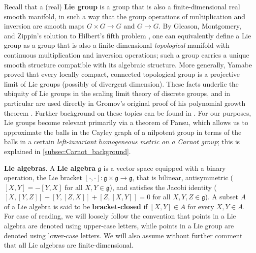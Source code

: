 Recall that a (real) \textbf{Lie group} is a group that is also a finite-dimensional real smooth manifold, in such a way that the group operations of multiplication and inversion are smooth maps $G\times G \to G$ and $G\to G$. By Gleason, Montgomery, and Zippin's solution to Hilbert's fifth problem \cite{MR49204,MR49203}, one can equivalently define a Lie group as a group that is also a finite-dimensional \emph{topological} manifold with continuous multiplication and inversion operations; such a group carries a unique smooth structure compatible with its algebraic structure. More generally, Yamabe \cite{MR36766} proved that every locally compact, connected topological group is a projective limit of Lie groups (possibly of divergent dimension). These facts underlie the ubiquity of Lie groups in the scaling limit theory of discrete groups, and in particular are used directly in Gromov's original proof of his polynomial growth theorem \cite{gromov81poly}. Further background on these topics can be found in \cite{MR3237440}. For our purposes, Lie groups become relevant primarily via a theorem of Pansu, which allows us to approximate the balls in the Cayley graph of a nilpotent group in terms of the balls in a certain \emph{left-invariant homogeneous metric on a Carnot group}; this is explained in \cref{subsec:Carnot_background}.

\medskip

\textbf{Lie algebras}. A \textbf{Lie algebra} $\mathfrak{g}$ is a vector space equipped with a binary operation, the Lie bracket $[\cdot, \cdot]: \mathfrak{g} \times \mathfrak{g} \rightarrow \mathfrak{g}$, that is bilinear, antisymmetric ($[X, Y] = -[Y, X]$ for all $X, Y \in \mathfrak{g}$), and satisfies the Jacobi identity ($[X, [Y, Z]] + [Y, [Z, X]] + [Z, [X, Y]] = 0$ for all $X, Y, Z \in \mathfrak{g}$). A subset $A$ of a Lie algebra is said to be \textbf{bracket-closed} if $[X,Y]\in A$ for every $X,Y\in A$.
For ease of reading, we will loosely follow the convention that points in a Lie algebra are denoted using upper-case letters, while points in a Lie group are denoted using lower-case letters. We will also assume without further comment that all Lie algebras are finite-dimensional. 

\medskip

